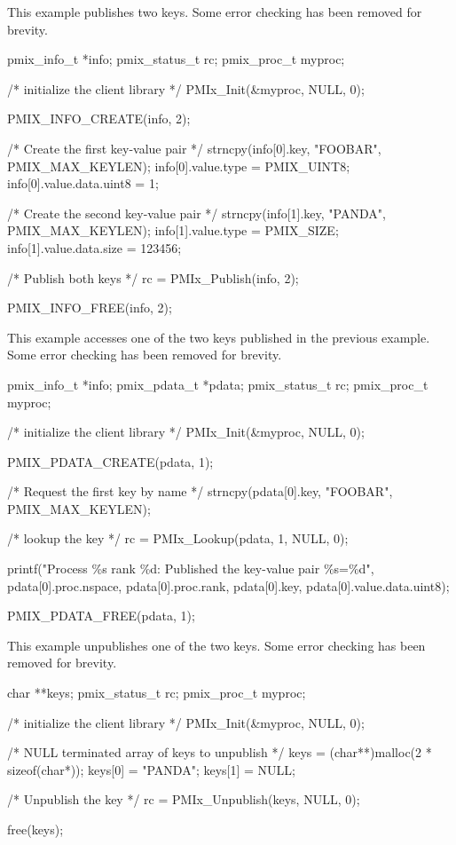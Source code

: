 This example publishes two keys.
Some error checking has been removed for brevity.

\cspecificstart
\begin{codepar}
pmix_info_t *info;
pmix_status_t rc;
pmix_proc_t myproc;

/* initialize the client library */
PMIx_Init(&myproc, NULL, 0);

PMIX_INFO_CREATE(info, 2);

/* Create the first key-value pair */
strncpy(info[0].key, "FOOBAR", PMIX_MAX_KEYLEN);
info[0].value.type = PMIX_UINT8;
info[0].value.data.uint8 = 1;

/* Create the second key-value pair */
strncpy(info[1].key, "PANDA", PMIX_MAX_KEYLEN);
info[1].value.type = PMIX_SIZE;
info[1].value.data.size = 123456;

/* Publish both keys */
rc = PMIx_Publish(info, 2);

PMIX_INFO_FREE(info, 2);
\end{codepar}
\cspecificend


This example accesses one of the two keys published in the previous example.
Some error checking has been removed for brevity.

\cspecificstart
\begin{codepar}
pmix_info_t *info;
pmix_pdata_t *pdata;
pmix_status_t rc;
pmix_proc_t myproc;

/* initialize the client library */
PMIx_Init(&myproc, NULL, 0);

PMIX_PDATA_CREATE(pdata, 1);

/* Request the first key by name */
strncpy(pdata[0].key, "FOOBAR", PMIX_MAX_KEYLEN);

/* lookup the key */
rc = PMIx_Lookup(pdata, 1, NULL, 0);

printf("Process \%s rank \%d: Published the key-value pair \%s=\%d",
       pdata[0].proc.nspace, pdata[0].proc.rank,
       pdata[0].key, pdata[0].value.data.uint8);

PMIX_PDATA_FREE(pdata, 1);
\end{codepar}
\cspecificend


This example unpublishes one of the two keys.
Some error checking has been removed for brevity.

\cspecificstart
\begin{codepar}
char **keys;
pmix_status_t rc;
pmix_proc_t myproc;

/* initialize the client library */
PMIx_Init(&myproc, NULL, 0);

/* NULL terminated array of keys to unpublish */
keys = (char**)malloc(2 * sizeof(char*));
keys[0] = "PANDA";
keys[1] = NULL;

/* Unpublish the key */
rc = PMIx_Unpublish(keys, NULL, 0);

free(keys);
\end{codepar}
\cspecificend


